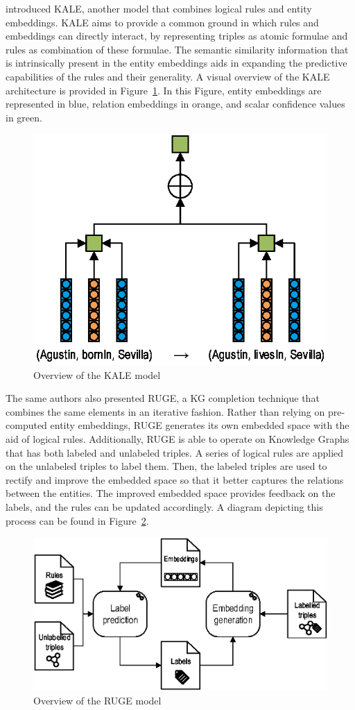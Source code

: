 \citet{guo2016} introduced KALE, another model that combines logical rules and entity embeddings. KALE aims to provide a common ground in which rules and embeddings can directly interact, by representing triples as atomic formulae and rules as combination of these formulae. The semantic similarity information that is intrinsically present in the entity embeddings aids in expanding the predictive capabilities of the rules and their generality. A visual overview of the KALE architecture is provided in Figure~\ref{fig:rule-kale}. In this Figure, entity embeddings are represented in blue, relation embeddings in orange, and scalar confidence values in green.

\begin{figure}[!htp]
    \centering
    \includegraphics[width=.65\textwidth]{fig/rules/kale}
    \caption{Overview of the KALE model}
    \label{fig:rule-kale}
\end{figure}

The same authors \cite{guo2018} also presented RUGE, a KG completion technique that combines the same elements in an iterative fashion. Rather than relying on pre-computed entity embeddings, RUGE generates its own embedded space with the aid of logical rules. Additionally, RUGE is able to operate on Knowledge Graphs that has both labeled and unlabeled triples. A series of logical rules are applied on the unlabeled triples to label them. Then, the labeled triples are used to rectify and improve the embedded space so that it better captures the relations between the entities. The improved embedded space provides feedback on the labels, and the rules can be updated accordingly. A diagram depicting this process can be found in Figure~\ref{fig:rule-ruge}.

\begin{figure}[!htp]
    \centering
    \includegraphics[width=.85\textwidth]{fig/rules/ruge}
    \caption{Overview of the RUGE model}
    \label{fig:rule-ruge}
\end{figure}

